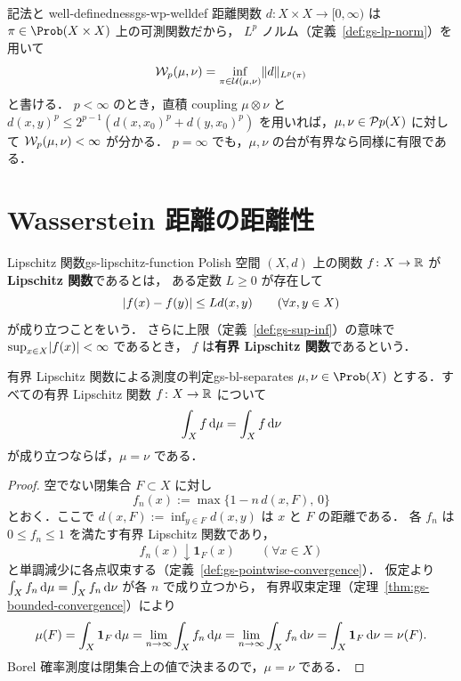 \begin{remark}{記法と well-definedness}{gs-wp-welldef}
  距離関数 $d\colon X\times X\to[0,\infty)$ は
  $\pi\in\Prob(X\times X)$ 上の可測関数だから，
  $L^p$ ノルム（定義~\ref{def:gs-lp-norm}）を用いて
  \[
    \mathcal{W}_p(\mu,\nu)
    =\inf_{\pi\in\mathcal{U}(\mu,\nu)}\lVert d \rVert_{L^p(\pi)}
  \]
  と書ける．
  $p<\infty$ のとき，直積 coupling $\mu\otimes\nu$ と
  $d(x,y)^p\leq 2^{p-1}(d(x,x_0)^p+d(y,x_0)^p)$
  を用いれば，$\mu,\nu\in\mathcal{P}{p}(X)$ に対して $\mathcal{W}_p(\mu,\nu)<\infty$ が分かる．
  $p=\infty$ でも，$\mu,\nu$ の台が有界なら同様に有限である．
\end{remark}

\section{Wasserstein 距離の距離性}
\label{sec:metric-property}

\begin{definition}{Lipschitz 関数}{gs-lipschitz-function}
  Polish 空間 $(X,d)$ 上の関数 $f\colon X\to\mathbb{R}$ が\textbf{Lipschitz 関数}であるとは，
  ある定数 $L\geq0$ が存在して
  \[
    \lvert f(x)-f(y) \rvert\leq Ld(x,y)
    \qquad(\forall x,y\in X)
  \]
  が成り立つことをいう．
  さらに上限（定義~\ref{def:gs-sup-inf}）の意味で $\sup_{x\in X}\lvert f(x) \rvert<\infty$ であるとき，
  $f$ は\textbf{有界 Lipschitz 関数}であるという．
\end{definition}

\begin{lemma}{有界 Lipschitz 関数による測度の判定}{gs-bl-separates}
  $\mu,\nu\in\Prob(X)$ とする．すべての有界 Lipschitz 関数 $f\colon X\to\mathbb{R}$ について
  \[
    \int_X f\,\mathrm{d}\mu=\int_X f\,\mathrm{d}\nu
  \]
  が成り立つならば，$\mu=\nu$ である．
\end{lemma}

\begin{proof}
  空でない閉集合 $F\subset X$ に対し
  \[
    f_n(x):=\max\{1-n\,d(x,F),\,0\}
  \]
  とおく．ここで $d(x,F):=\inf_{y\in F}d(x,y)$ は $x$ と $F$ の距離である．
  各 $f_n$ は $0\leq f_n\leq 1$ を満たす有界 Lipschitz 関数であり，
  \[
    f_n(x)\downarrow\mathbf{1}_F(x)
    \qquad(\forall x\in X)
  \]
  と単調減少に各点収束する（定義~\ref{def:gs-pointwise-convergence}）．
  仮定より $\int_X f_n\,\mathrm{d}\mu=\int_X f_n\,\mathrm{d}\nu$ が各 $n$ で成り立つから，
  有界収束定理（定理~\ref{thm:gs-bounded-convergence}）により
  \[
    \mu(F)=\int_X\mathbf{1}_F\,\mathrm{d}\mu
    =\lim_{n\to\infty}\int_X f_n\,\mathrm{d}\mu
    =\lim_{n\to\infty}\int_X f_n\,\mathrm{d}\nu
    =\int_X\mathbf{1}_F\,\mathrm{d}\nu=\nu(F).
  \]
  Borel 確率測度は閉集合上の値で決まるので，$\mu=\nu$ である．
\end{proof}

